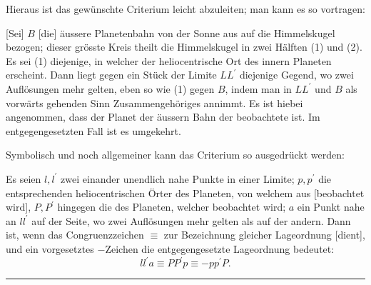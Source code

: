 Hieraus ist das gewünschte Criterium leicht abzuleiten; man kann es so vortragen:

[Sei] \(B\) [die] äussere Planetenbahn von der Sonne aus auf die Himmelskugel bezogen; dieser grösste Kreis theilt die Himmelskugel in zwei Hälften (1) und (2). Es sei (1) diejenige, in welcher der heliocentrische Ort des innern Planeten erscheint. Dann liegt gegen ein Stück der Limite \(LL^{\prime}\) diejenige Gegend, wo zwei Auflösungen mehr gelten, eben so wie (1) gegen \(B\), indem man in \(LL^{\prime}\) und \(B\) als vorwärts gehenden Sinn Zusammengehöriges annimmt. Es ist hiebei angenommen, dass der Planet der äussern Bahn der beobachtete ist. Im entgegengesetzten Fall ist es umgekehrt.

Symbolisch und noch allgemeiner kann das Criterium so ausgedrückt werden:

Es seien \(l,l^{\prime}\) zwei einander unendlich nahe Punkte in einer Limite; \(p,p^{\prime}\) die entsprechenden heliocentrischen Örter des Planeten, von welchem aus [beobachtet wird], \(P,P^{\prime}\) hingegen die des Planeten, welcher beobachtet wird; \(a\) ein Punkt nahe an \(ll^{\prime}\) auf der Seite, wo zwei Auflösungen mehr gelten als auf der andern. Dann ist, wenn das Congruenzzeichen \(\equiv\) zur Bezeichnung gleicher Lageordnung [dient], und ein vorgesetztes \(-\)Zeichen die entgegengesetzte Lageordnung bedeutet:
\[
ll^{\prime}a\equiv PP^{\prime}p\equiv-pp^{\prime}P.
\]
\begin{center}\rule{.22\textwidth}{.3pt}\end{center}
